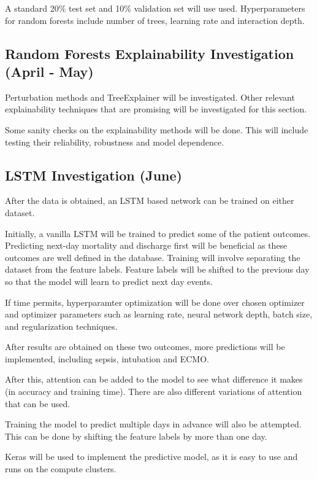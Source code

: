 \documentclass[12pt]{article}
\begin{document}
A standard 20\% test set and 10\% validation set will use used. Hyperparameters for random forests include number of trees, learning rate and interaction depth. 

\subsection{Random Forests Explainability Investigation (April - May)}

Perturbation methods and TreeExplainer will be investigated. Other relevant explainability techniques that are promising will be investigated for this section. 

Some sanity checks on the explainability methods will be done. This will include testing their reliability, robustness and model dependence.

\subsection{LSTM Investigation (June)}

After the data is obtained, an LSTM based network can be trained on either dataset.

Initially, a vanilla LSTM will be trained to predict some of the patient outcomes. Predicting next-day mortality and discharge first will be beneficial as these outcomes are well defined in the database. Training will involve separating the dataset from the feature labels. Feature labels will be shifted to the previous day so that the model will learn to predict next day events.

If time permits, hyperparamter optimization will be done over chosen optimizer and optimizer parameters such as learning rate, neural network depth, batch size, and regularization techniques. 

After results are obtained on these two outcomes, more predictions will be implemented, including sepsis, intubation and ECMO.

After this, attention can be added to the model to see what difference it makes (in accuracy and training time). There are also different variations of attention that can be used. 

Training the model to predict multiple days in advance will also be attempted. This can be done by shifting the feature labels by more than one day. 

Keras will be used to implement the predictive model, as it is easy to use and runs on the compute clusters.
\end{document}
